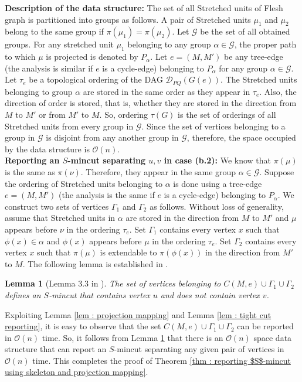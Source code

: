 \documentclass[letterpaper,11pt]{article}
\newtheorem{lemma}{Lemma}[]
\begin{document}
\noindent
\textbf{Description of the data structure:} The set of all Stretched units of Flesh graph is partitioned into groups as follows. A pair of Stretched units $\mu_1$ and $\mu_2$ belong to the same group if $\pi(\mu_1)=\pi(\mu_2)$. Let ${\mathcal G}$ be the set of all obtained groups. For any stretched unit $\mu_1$ belonging to any group $\alpha\in {\mathcal G}$, the proper path to which $\mu$ is projected is denoted by $P_{\alpha}$. Let $e=(M,M')$ be any tree-edge (the analysis is similar if $e$ is a cycle-edge) belonging to $P_{\alpha}$ for any group $\alpha\in {\mathcal G}$. Let $\tau_e$ be a topological ordering of the DAG ${\mathcal D}_{PQ}(G(e))$. The Stretched units belonging to group $\alpha$ are stored in the same order as they appear in $\tau_e$. Also, the direction of order is stored, that is, whether they are stored in the direction from $M$ to $M'$ or from $M'$ to $M$. So, ordering $\tau(G)$ is the set of orderings of all Stretched units from every group in ${\mathcal G}$. Since the set of vertices belonging to a group in ${\mathcal G}$ is disjoint from any another group in ${\mathcal G}$, therefore, the space occupied by the data structure is ${\mathcal O}(n)$. \\

\noindent
\textbf{Reporting an $S$-mincut separating $u,v$ in case (b.2):} We know that $\pi(\mu)$ is the same as $\pi(\nu)$. Therefore, they appear in the same group $\alpha\in {\mathcal G}$. Suppose the ordering of Stretched units belonging to $\alpha$ is done using a tree-edge $e=(M,M')$ (the analysis is the same if $e$ is a cycle-edge) belonging to $P_{\alpha}$. We construct two sets of vertices $\Gamma_1$ and $\Gamma_2$ as follows. Without loss of generality, assume that Stretched units in $\alpha$ are stored in the direction from $M$ to $M'$ and $\mu$ appears before $\nu$ in the ordering $\tau_e$. Set $\Gamma_1$ contains every vertex $x$ such that $\phi(x)\in \alpha$ and $\phi(x)$ appears before $\mu$ in the ordering $\tau_e$. Set $\Gamma_2$ contains every vertex $x$ such that $\pi(\mu)$ is extendable to $\pi(\phi(x))$ in the direction from $M'$ to $M$. The following lemma is established in \cite{DBLP:conf/soda/BaswanaP22}.
\begin{lemma} [Lemma 3.3 in \cite{DBLP:conf/soda/BaswanaP22}] \label{lem : lemma to report s mincut separating pair of vertices}
    The set of vertices belonging to $C(M,e)\cup \Gamma_1 \cup \Gamma_2$ defines an $S$-mincut that contains vertex $u$ and does not contain vertex $v$.  
\end{lemma}
Exploiting Lemma \ref{lem : projection mapping} and Lemma \ref{lem : tight cut reporting}, it is easy to observe that the set $C(M,e)\cup \Gamma_1 \cup \Gamma_2$ can be reported in ${\mathcal O}(n)$ time. So, it follows from Lemma \ref{lem : lemma to report s mincut separating pair of vertices} that there is an ${\mathcal O}(n)$ space data structure that can report an $S$-mincut separating any given pair of vertices in ${\mathcal O}(n)$ time. This completes the proof of Theorem \ref{thm : reporting $S$-mincut using skeleton and projection mapping}. 
\end{document}
